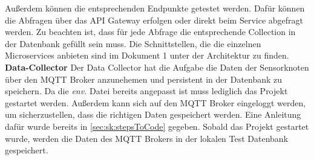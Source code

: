 Außerdem können die entsprechenden Endpunkte getestet werden. Dafür können die Abfragen über das API Gateway erfolgen oder direkt beim Service abgefragt werden. Zu beachten ist, dass für jede Abfrage die entsprechende Collection in der Datenbank gefüllt sein muss. Die Schnittstellen, die die einzelnen Microservices anbieten sind im Dokument 1 unter der Architektur zu finden. \newline
\textbf{Data-Collector}\newline
Der Data Collector hat die Aufgabe die Daten der Sensorknoten über den MQTT Broker anzunehemen und persistent in der Datenbank zu speichern. Da die \textit{env.} Datei bereits angepasst ist muss lediglich das Projekt gestartet werden. Außerdem kann sich auf den MQTT Broker eingeloggt werden, um sicherzustellen, dass die richtigen Daten gespeichert werden. Eine Anleitung dafür wurde bereits in \ref{sec:sk:stepsToCode} gegeben. Sobald das Projekt gestartet wurde, werden die Daten des MQTT Brokers in der lokalen Test Datenbank gespeichert. 

